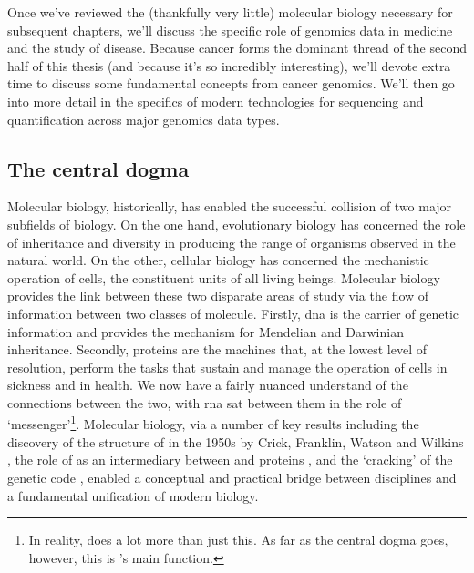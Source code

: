 \documentclass[thesis.tex]{subfiles}
\begin{document}
Once we've reviewed the (thankfully very little) molecular biology necessary for subsequent chapters, we'll discuss the specific role of genomics data in medicine and the study of disease. Because cancer forms the dominant thread of the second half of this thesis (and because it's so incredibly interesting), we'll devote extra time to discuss some fundamental concepts from cancer genomics. We'll then go into more detail in the specifics of modern technologies for sequencing and quantification across major genomics data types.

\subsection{The central dogma}
Molecular biology, historically, has enabled the successful collision of two major subfields of biology. On the one hand, evolutionary biology has concerned the role of inheritance and diversity in producing the range of organisms observed in the natural world. On the other, cellular biology has concerned the mechanistic operation of cells, the constituent units of all living beings. Molecular biology provides the link between these two disparate areas of study via the flow of information between two classes of molecule. Firstly, \gls{dna} is the carrier of genetic information and provides the mechanism for Mendelian and Darwinian inheritance. Secondly, proteins are the machines that, at the lowest level of resolution, perform the tasks that sustain and manage the operation of cells in sickness and in health. We now have a fairly nuanced understand of the connections between the two, with \gls{rna} sat between them in the role of `messenger'\footnote{In reality,  does a lot more than just this. As far as the central dogma goes, however, this is 's main function.}. Molecular biology, via a number of key results including the discovery of the structure of  in the 1950s by Crick, Franklin, Watson and Wilkins \citep{franklin_molecular_1953, watson_molecular_1953, wilkins_molecular_1953, maddox_double_2003}, the role of  as an intermediary between  and proteins \citep{boivin_sur_1947, crick_protein_1958, brenner_unstable_1961, cobb_who_2015}, and the `cracking' of the genetic code \citep{crick_general_1961, nirenberg_rna_1964, brenner_uga_1967, tamura_genetic_2016}, enabled a conceptual and practical bridge
between disciplines and a fundamental unification of modern biology. 
\end{document}
